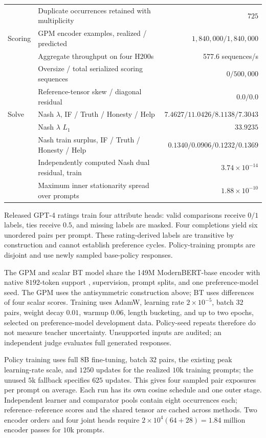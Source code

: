 \documentclass{article}
\theoremstyle{remark}
\theoremstyle{plain}
\begin{document}
\begin{table}[t]
\begin{tabular}{@{}p{}p{}r@{}}
 & Duplicate occurrences retained with multiplicity & $725$\\
Scoring & GPM encoder examples, realized / predicted & $1{,}840{,}000 / 1{,}840{,}000$\\
 & Aggregate throughput on four H200s & \textrm{577.6 sequences/s}\\
 & Oversize / total serialized scoring sequences & $0 / 500{,}000$\\
 & Reference-tensor skew / diagonal residual & $0.0 / 0.0$\\
Solve & Nash $\lambda$, IF / Truth / Honesty / Help & $7.4627 / 11.0426 / 8.1138 / 7.3043$\\
 & Nash $\lambda$ $L_1$ & $33.9235$\\
 & Nash train surplus, IF / Truth / Honesty / Help & $0.1340 / 0.0906 / 0.1232 / 0.1369$\\
 & Independently computed Nash dual residual, train & $3.74\times10^{-14}$\\
 & Maximum inner stationarity spread over prompts & $1.88\times10^{-10}$\\
\bottomrule
\end{tabular}
\end{table}

Released GPT-4 ratings train four attribute heads: valid comparisons receive $0/1$ labels, ties receive $0.5$, and missing labels are masked. Four completions yield six unordered pairs per prompt. These rating-derived labels are transitive by construction and cannot establish preference cycles. Policy-training prompts are disjoint and use newly sampled base-policy responses.

The GPM and scalar BT model share the 149M ModernBERT-base encoder with native $8192$-token support \citep{warner2024modernbert}, supervision, prompt splits, and one preference-model seed. The GPM uses the antisymmetric construction above; BT uses differences of four scalar scores. Training uses AdamW, learning rate $2\times10^{-5}$, batch $32$ pairs, weight decay $0.01$, warmup $0.06$, length bucketing, and up to two epochs, selected on preference-model development data. Policy-seed repeats therefore do not measure teacher uncertainty. Unsupported inputs are audited; an independent judge evaluates full generated responses.

Policy training uses full 8B fine-tuning, batch $32$ pairs, the existing peak learning-rate scale, and $1250$ updates for the realized $10$k training prompts; the unused $5$k fallback specifies $625$ updates. This gives four sampled pair exposures per prompt on average. Each run has its own cosine schedule and one outer stage. Independent learner and comparator pools contain eight occurrences each; reference--reference scores and the shared tensor are cached across methods. Two encoder orders and four joint heads require $2\times10^4(64+28)=1.84$ million encoder passes for $10$k prompts.
\end{document}
